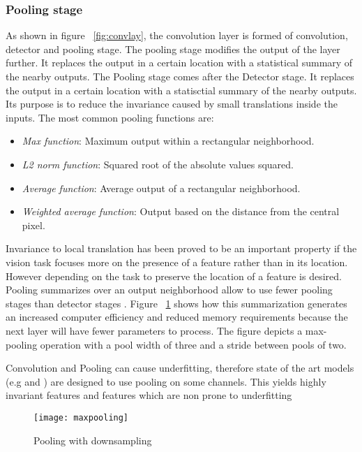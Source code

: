 
\subsubsection{Pooling stage}
\label{subsub:pool}
As shown in figure ~\ref{fig:convlay}, the convolution layer is formed of convolution, detector and pooling stage. The pooling stage modifies the output of the layer further. It replaces the output in a certain location with a statistical summary of the nearby outputs. 
The Pooling stage comes after the Detector stage. It replaces the output in a certain location with a statisctial summary of the nearby outputs. Its purpose is to reduce the invariance caused by small translations inside the inputs. The most common pooling functions are:

\begin{itemize}
 \item \textit{Max function}: Maximum output within a rectangular neighborhood.
 \item \textit{L2 norm function}: Squared root of the absolute values squared.
 \item \textit{Average function}: Average output of a rectangular neighborhood.
 \item \textit{Weighted average function}: Output based on the distance from the central pixel.
\end{itemize}

Invariance to local translation has been proved to be an important property if the vision task focuses more on the presence of a feature rather than in its location. However depending on the task to preserve the location of a feature is desired.
Pooling summarizes over an output neighborhood allow to use fewer pooling stages than detector stages . Figure ~\ref{fig:maxpool} shows how this summarization generates an increased computer efficiency and reduced memory requirements because the next layer will have fewer parameters to process. The figure depicts a max-pooling operation with a pool width of three and a stride between pools of two. 

Convolution and Pooling can cause underfitting, therefore state of the art models (e.g \textcite{Krizhevsky_imagenetclassification} and \textcite{szegedy2014going}) are designed to use pooling on some channels. This yields highly invariant features and features which are non prone to underfitting

\begin{figure}
 \centering
 \texttt{[image: maxpooling]}
 \caption{Pooling with downsampling}
 \label{fig:maxpool}
\end{figure}

